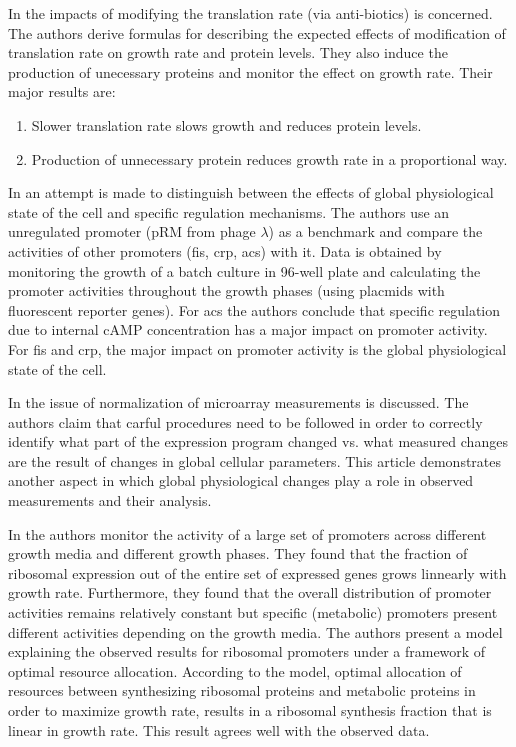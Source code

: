 \documentclass{report}
\begin{document}
In \cite{Scott2010a} the impacts of modifying the translation rate (via anti-biotics) is concerned.
The authors derive formulas for describing the expected effects of modification of translation rate on growth rate and protein levels.
They also induce the production of unecessary proteins and monitor the effect on growth rate.
Their major results are:
\begin{enumerate}
\item Slower translation rate slows growth and reduces protein levels.
\item Production of unnecessary protein reduces growth rate in a proportional way.
\end{enumerate}

In \cite{Berthoumieux2013} an attempt is made to distinguish between the effects of global physiological state of the cell and specific regulation mechanisms.
The authors use an unregulated promoter (pRM from phage $\lambda$) as a benchmark and compare the activities of other promoters (fis, crp, acs) with it.
Data is obtained by monitoring the growth of a batch culture in 96-well plate and calculating the promoter activities throughout the growth phases (using placmids with fluorescent reporter genes).
For acs the authors conclude that specific regulation due to internal cAMP concentration has a major impact on promoter activity.
For fis and crp, the major impact on promoter activity is the global physiological state of the cell.

In \cite{loven2012} the issue of normalization of microarray measurements is discussed.
The authors claim that carful procedures need to be followed in order to correctly identify what part of the expression program changed vs. what measured changes are the result of changes in global cellular parameters.
This article demonstrates another aspect in which global physiological changes play a role in observed measurements and their analysis.

In \cite{Zaslaver2009a} the authors monitor the activity of a large set of promoters across different growth media and different growth phases.
They found that the fraction of ribosomal expression out of the entire set of expressed genes grows linnearly with growth rate.
Furthermore, they found that the overall distribution of promoter activities remains relatively constant but specific (metabolic) promoters present different activities depending on the growth media.
The authors present a model explaining the observed results for ribosomal promoters under a framework of optimal resource allocation.
According to the model, optimal allocation of resources between synthesizing ribosomal proteins and metabolic proteins in order to maximize growth rate, results in a ribosomal synthesis fraction that is linear in growth rate.
This result agrees well with the observed data.
\end{document}

